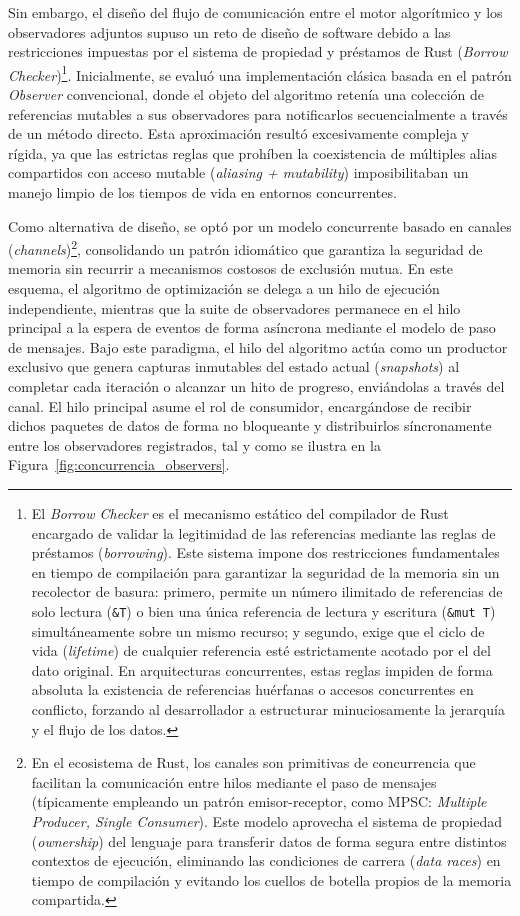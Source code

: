 \documentclass[12pt,a4paper,twoside,openright]{book}
\begin{document}
        Sin embargo, el diseño del flujo de comunicación entre el motor algorítmico y los observadores adjuntos supuso un reto de diseño de software debido a las restricciones impuestas por el sistema de propiedad y préstamos de Rust (\textit{Borrow Checker})\footnote{El \textit{Borrow Checker} es el mecanismo estático del compilador de Rust encargado de validar la legitimidad de las referencias mediante las reglas de préstamos (\textit{borrowing}). Este sistema impone dos restricciones fundamentales en tiempo de compilación para garantizar la seguridad de la memoria sin un recolector de basura: primero, permite un número ilimitado de referencias de solo lectura (\texttt{\&T}) o bien una única referencia de lectura y escritura (\texttt{\&mut T}) simultáneamente sobre un mismo recurso; y segundo, exige que el ciclo de vida (\textit{lifetime}) de cualquier referencia esté estrictamente acotado por el del dato original. En arquitecturas concurrentes, estas reglas impiden de forma absoluta la existencia de referencias huérfanas o accesos concurrentes en conflicto, forzando al desarrollador a estructurar minuciosamente la jerarquía y el flujo de los datos.}. Inicialmente, se evaluó una implementación clásica basada en el patrón \textit{Observer} convencional, donde el objeto del algoritmo retenía una colección de referencias mutables a sus observadores para notificarlos secuencialmente a través de un método directo. Esta aproximación resultó excesivamente compleja y rígida, ya que las estrictas reglas que prohíben la coexistencia de múltiples alias compartidos con acceso mutable (\textit{aliasing + mutability}) imposibilitaban un manejo limpio de los tiempos de vida en entornos concurrentes.

        Como alternativa de diseño, se optó por un modelo concurrente basado en canales (\textit{channels})\footnote{En el ecosistema de Rust, los canales son primitivas de concurrencia que facilitan la comunicación entre hilos mediante el paso de mensajes (típicamente empleando un patrón emisor-receptor, como MPSC: \textit{Multiple Producer, Single Consumer}). Este modelo aprovecha el sistema de propiedad (\textit{ownership}) del lenguaje para transferir datos de forma segura entre distintos contextos de ejecución, eliminando las condiciones de carrera (\textit{data races}) en tiempo de compilación y evitando los cuellos de botella propios de la memoria compartida.}, consolidando un patrón idiomático que garantiza la seguridad de memoria sin recurrir a mecanismos costosos de exclusión mutua. En este esquema, el algoritmo de optimización se delega a un hilo de ejecución independiente, mientras que la suite de observadores permanece en el hilo principal a la espera de eventos de forma asíncrona mediante el modelo de paso de mensajes. Bajo este paradigma, el hilo del algoritmo actúa como un productor exclusivo que genera capturas inmutables del estado actual (\textit{snapshots}) al completar cada iteración o alcanzar un hito de progreso, enviándolas a través del canal. El hilo principal asume el rol de consumidor, encargándose de recibir dichos paquetes de datos de forma no bloqueante y distribuirlos síncronamente entre los observadores registrados, tal y como se ilustra en la Figura~\ref{fig:concurrencia_observers}.
\end{document}
